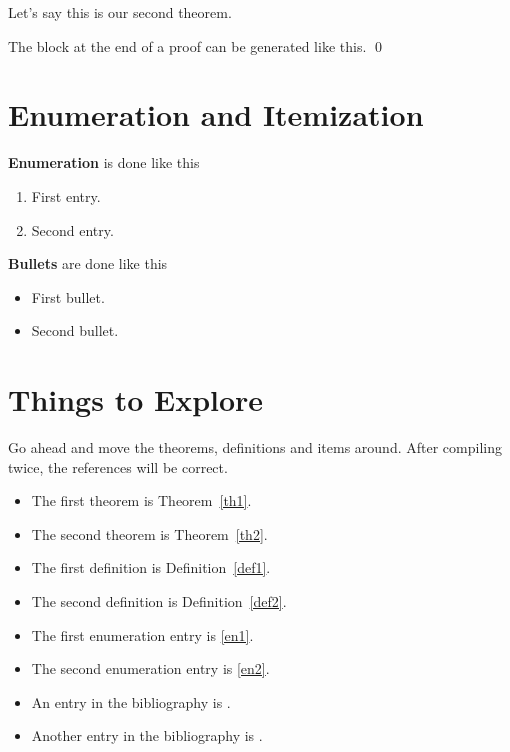\begin{theorem}
\label{th2}

Let's say this is our second theorem.

\end{theorem}


The block at the end of a proof can be generated like this. \qed


\section{Enumeration and Itemization}

{\bf Enumeration} is done like this

\begin{enumerate}
\item
\label{en1}
First entry.

\item
\label{en2}
Second entry.

\end{enumerate}


{\bf Bullets} are done like this

\begin{itemize}
\item
First bullet.

\item
Second bullet.

\end{itemize}





\section{Things to Explore}
\label{explore}

Go ahead and move the theorems, definitions and items around.
After compiling twice, the references will be correct.

\begin{itemize}
\item
The first theorem is Theorem~\ref{th1}.

\item
The second theorem is Theorem~\ref{th2}.

\item
The first definition is Definition~\ref{def1}.

\item
The second definition is Definition~\ref{def2}.

\item
The first enumeration entry is \ref{en1}.

\item
The second enumeration entry is \ref{en2}.

\item
An entry in the bibliography is \cite{bib1}.

\item
Another entry in the bibliography is \cite{bib2}.

\end{itemize}

